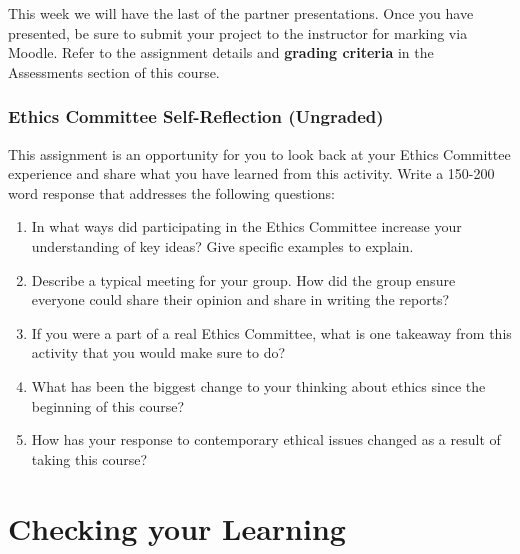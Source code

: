 \documentclass[
]{book}
\providecommand{\tightlist}{%
  \setlength{\itemsep}{0pt}\setlength{\parskip}{0pt}}
\begin{document}
\begin{assessment}
This week we will have the last of the partner presentations. Once you have
presented, be sure to submit your project to the instructor for marking via
Moodle. Refer to the assignment details and \textbf{grading criteria} in the Assessments section of this course.

\hypertarget{ethics-committee-self-reflection-ungraded}{%
\subsubsection*{Ethics Committee Self-Reflection (Ungraded)}\label{ethics-committee-self-reflection-ungraded}}

This assignment is an opportunity for you to look back at your Ethics Committee experience and share what you have learned from this activity. Write a 150-200 word response that addresses the following questions:

\begin{enumerate}
\def\labelenumi{\arabic{enumi}.}
\tightlist
\item
  In what ways did participating in the Ethics Committee increase your understanding of key ideas? Give specific examples to explain.\\
\item
  Describe a typical meeting for your group. How did the group ensure everyone could share their opinion and share in writing the reports?\\
\item
  If you were a part of a real Ethics Committee, what is one takeaway from this activity that you would make sure to do?\\
\item
  What has been the biggest change to your thinking about ethics since the beginning of this course?\\
\item
  How has your response to contemporary ethical issues changed as a result of taking this course?
\end{enumerate}
\end{assessment}

\hypertarget{checking-your-learning-9}{%
\section*{Checking your Learning}\label{checking-your-learning-9}}
\end{document}
